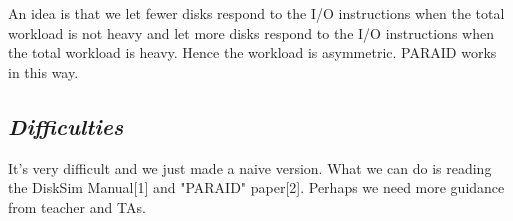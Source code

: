 \documentclass[conference]{IEEEtran}
\begin{document}
An idea is that we let fewer disks respond to the I/O instructions when the total workload is not heavy and let more disks respond to the I/O instructions when the total workload is heavy. Hence the workload is asymmetric. PARAID works in this way.\\
\subsection{\emph{\textbf{Difficulties}}}
It's very difficult and we just made a naive version. What we can do is reading the DiskSim Manual[1] and "PARAID" paper[2]. Perhaps we need more guidance from teacher and TAs.





%
%
%
\end{document}
